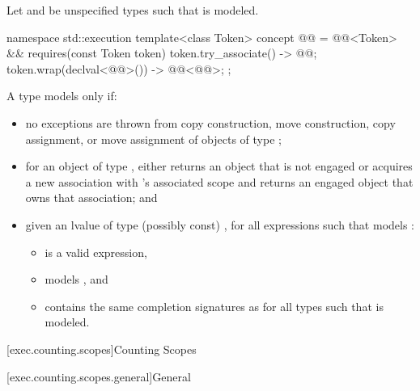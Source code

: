 \pnum
Let  and 
be unspecified types such that
is modeled.

\begin{codeblock}
namespace std::execution {
  template<class Token>
    concept @@ =
      @@<Token> &&
      requires(const Token token) {
        { token.try_associate() } -> @@;
        { token.wrap(declval<@@>()) } -> @@<@@>;
      };
}
\end{codeblock}

\pnum
A type  models  only if:

\begin{itemize}
\item
no exceptions are thrown from
copy construction,
move construction,
copy assignment, or
move assignment
of objects of type ;

\item
for an object  of type ,
 either
returns an object that is not engaged or
acquires a new association with 's associated scope and
returns an engaged object that owns that association; and

\item
given an lvalue  of type (possibly const) ,
for all expressions  such that
 models :
  \begin{itemize}
  \item
   is a valid expression,
  \item
   models , and
  \item
  contains the same completion signatures as
  for all types  such that
   is modeled.
  \end{itemize}
\end{itemize}

[exec.counting.scopes]{Counting Scopes}

[exec.counting.scopes.general]{General}

